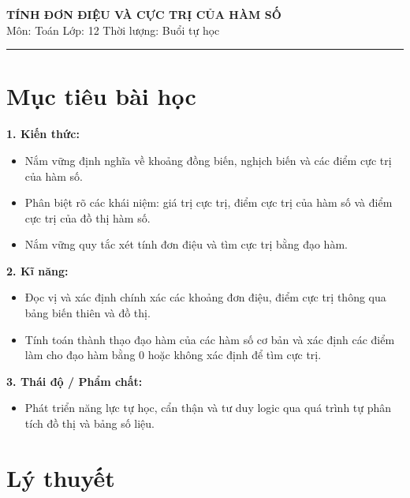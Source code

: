 \documentclass[12pt]{article}
\begin{document}
	
	\begin{center}
		{\LARGE \textbf{TÍNH ĐƠN ĐIỆU VÀ CỰC TRỊ CỦA HÀM SỐ}}\\[4pt]
		{\large Môn: Toán \quad Lớp: 12 \quad Thời lượng: Buổi tự học}
	\end{center}
	\vspace{4mm}
	\hrule
	\vspace{4mm}
	
	\section*{Mục tiêu bài học}
	
	\textbf{1. Kiến thức:}
	\begin{itemize}
		\item Nắm vững định nghĩa về khoảng đồng biến, nghịch biến và các điểm cực trị của hàm số.
		\item Phân biệt rõ các khái niệm: giá trị cực trị, điểm cực trị của hàm số và điểm cực trị của đồ thị hàm số.
		\item Nắm vững quy tắc xét tính đơn điệu và tìm cực trị bằng đạo hàm.
	\end{itemize}
	
	\textbf{2. Kĩ năng:}
	\begin{itemize}
		\item Đọc vị và xác định chính xác các khoảng đơn điệu, điểm cực trị thông qua bảng biến thiên và đồ thị.
		\item Tính toán thành thạo đạo hàm của các hàm số cơ bản và xác định các điểm làm cho đạo hàm bằng $0$ hoặc không xác định để tìm cực trị.
	\end{itemize}
	
	\textbf{3. Thái độ / Phẩm chất:}
	\begin{itemize}
		\item Phát triển năng lực tự học, cẩn thận và tư duy logic qua quá trình tự phân tích đồ thị và bảng số liệu.
	\end{itemize}
	
	\newpage
	
	\setcounter{tocdepth}{2}
	\tableofcontents
	\newpage
	
	\section{Lý thuyết}
	
\end{document}
